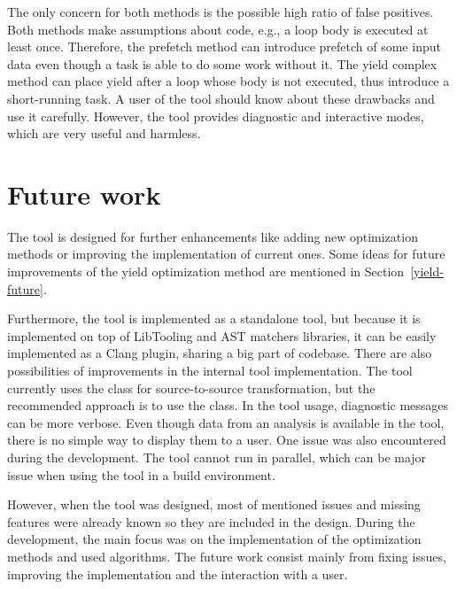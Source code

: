 The only concern for both methods is the possible high ratio of false positives. Both methods make assumptions about code, e.g., a loop body is executed at least once. Therefore, the prefetch method can introduce prefetch of some input data even though a task is able to do some work without it. The yield complex method can place yield after a loop whose body is not executed, thus introduce a short-running task. A user of the tool should know about these drawbacks and use it carefully. However, the tool provides diagnostic and interactive modes, which are very useful and harmless.

\section{Future work}
The tool is designed for further enhancements like adding new optimization methods or improving the implementation of current ones. Some ideas for future improvements of the yield optimization method are mentioned in Section~\ref{yield-future}.

Furthermore, the tool is implemented as a standalone tool, but because it is implemented on top of LibTooling and AST matchers libraries, it can be easily implemented as a Clang plugin, sharing a big part of codebase. There are also possibilities of improvements in the internal tool implementation. The tool currently uses the  class for source-to-source transformation, but the recommended approach is to use the  class. In the tool usage, diagnostic messages can be more verbose. Even though data from an analysis is available in the tool, there is no simple way to display them to a user. One issue was also encountered during the development. The tool cannot run in parallel, which can be major issue when using the tool in a build environment.

However, when the tool was designed, most of mentioned issues and missing features were already known so they are included in the design. During the development, the main focus was on the implementation of the optimization methods and used algorithms. The future work consist mainly from fixing issues, improving the implementation and the interaction with a user.